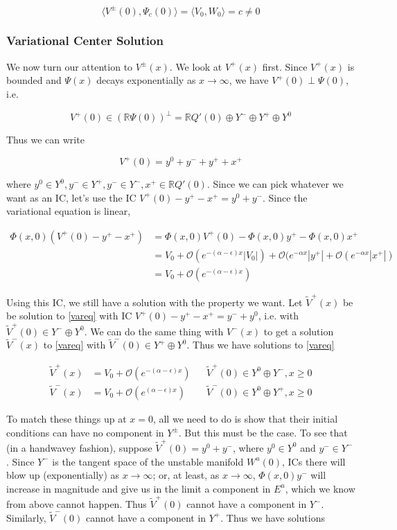 \documentclass[12pt]{article}
\def\R{{\mathbb R}}
\begin{document}
\[
\langle V^\pm(0), \Psi_c(0) \rangle = \langle V_0, W_0 \rangle = c \neq 0
\]

\subsubsection*{Variational Center Solution}

We now turn our attention to $V^\pm(x)$. We look at $V^+(x)$ first. Since $V^+(x)$ is bounded and $\Psi(x)$ decays exponentially as $x \rightarrow \infty$, we have $V^+(0) \perp \Psi(0)$, i.e. 

\[
V^+(0) \in (\R \Psi(0))^\perp = \R Q'(0) \oplus Y^- \oplus Y^+ \oplus Y^0
\]

Thus we can write 

\[
V^+(0) = y^0 + y^- + y^+ + x^+
\]

where $y^0 \in Y^0, y^- \in Y^+, y^- \in Y^-, x^+ \in \R Q'(0)$. Since we can pick whatever we want as an IC, let's use the IC $V^+(0) - y^+ - x^+ = y^0 + y^-$. Since the variational equation is linear,

\begin{align*}
\Phi(x, 0)( V^+(0) - y^+ - x^+ ) &= \Phi(x, 0)V^+(0) - \Phi(x, 0) y^+ - \Phi(x, 0) x^+ \\
&= V_0 + \mathcal{O}(e^{-(\alpha - \epsilon)x}|V_0|) + \mathcal{O}(e^{-\alpha x}|y^+| + 
\mathcal{O}(e^{-\alpha x}|x^+|) \\
&= V_0 + \mathcal{O}(e^{-(\alpha - \epsilon)x})
\end{align*}

Using this IC, we still have a solution with the property we want. Let $\tilde{V}^+(x)$ be be solution to \eqref{vareq} with IC $V^+(0) - y^+ - x^+ = y^- + y^0$, i.e. with $\tilde{V}^+(0) \in Y^- \oplus Y^0$. We can do the same thing with $V^-(x)$ to get a solution $\tilde{V}^-(x)$ to \eqref{vareq} with $\tilde{V}^-(0) \in Y^+ \oplus Y^0$. Thus we have solutions to \eqref{vareq}

\begin{align*}
\tilde{V}^+(x) &= V_0 + \mathcal{O}(e^{-(\alpha - \epsilon)x}) && \tilde{V}^+(0) \in Y^0 \oplus Y^-, x \geq 0 \\
\tilde{V}^-(x) &= V_0 + \mathcal{O}(e^{(\alpha - \epsilon)x}) && \tilde{V}^-(0) \in Y^0 \oplus Y^+, x \geq 0
\end{align*}

To match these things up at $x = 0$, all we need to do is show that their initial conditions can have no component in $Y^\pm$. But this must be the case. To see that (in a handwavey fashion), suppose $\tilde{V}^+(0) = y^0 + y^-$, where $y^0 \in Y^0$ and $y^- \in Y^-$. Since $Y^-$ is the tangent space of the unstable manifold $W^u(0)$, ICs there will blow up (exponentially) as $x \rightarrow \infty$; or, at least, as $x \rightarrow \infty$, $\Phi(x,0)y^-$ will increase in magnitude and give us in the limit a component in $E^u$, which we know from above cannot happen. Thus $\tilde{V}^+(0)$ cannot have a component in $Y^-$. Similarly, $\tilde{V}^-(0)$ cannot have a component in $Y^+$. Thus we have solutions 
\end{document}
